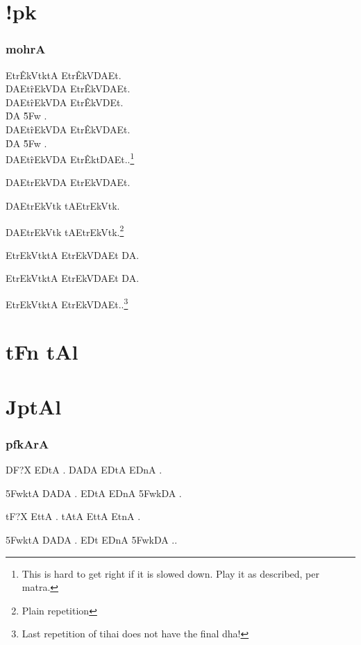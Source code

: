 \def\DevnagVersion{2.17}\documentclass{tufte-book}
\def\samaindent{\parindent=0.5in}
\def\dnitem#1{\noindent\llap{#1\space}\leftskip\parindent}
\begin{document}
\dnsamaveda

{\dn
\chapter{!pk}}

\subsection{ {\dn mohrA}}

{\dn \dnnum
{\dnsamaveda \samaindent
\dnitem{\rn{2}}

Etr\^{EkV}{}tktA Etr\^{EkV}{}DAEt.\\
DAEt\^{rEk}{}VDA Etr\^{EkV}{}DAEt.\\
DAEt\^{rEk}{}VDA Etr\^{EkV}{}DEt.\\
\hspace{0.25in} \^{DA}{} \hspace{0.5in} \^{\35Fw}{} \hspace{0.25in}.\\
DAEt\^{rEk}{}VDA Etr\^{EkV}{}DAEt.\\
\hspace{0.25in} \^{DA}{} \hspace{0.5in} \^{\35Fw}{} \hspace{0.25in}.\\
DAEt\^{rEk}{}VDA Etr\^{Ekt}{}DAEt..\footnote{This is hard to get right if it is slowed down. Play it as
described, per matra.}
\\}}



{\dn \dnnum
{\dnsamaveda \samaindent
\dnitem{\rn{3}}

DAEtrEkVDA EtrEkVDAEt.

DAEtrEkVtk tAEtrEkVtk.

DAEtrEkVtk tAEtrEkVtk.\footnote{Plain repetition}

EtrEkVtktA EtrEkVDAEt DA.

EtrEkVtktA EtrEkVDAEt DA.

EtrEkVtktA EtrEkVDAEt..\footnote{Last repetition of tihai does not have the final dha!}

}}


{\dn\chapter{ tFn tAl}}

{\dn\chapter{ JptAl}}

\subsection{{\dn p\?fkArA}}
\noindent
{\dn 

DF?X ED\2tA . DADA ED\2tA ED\2nA .

\35FwktA DADA . ED\2tA ED\2nA \35FwkDA .

tF?X Et\2tA . tAtA Et\2tA Et\2nA .

\35FwktA DADA . ED\2t ED\2nA \35FwkDA ..

}
\end{document}
